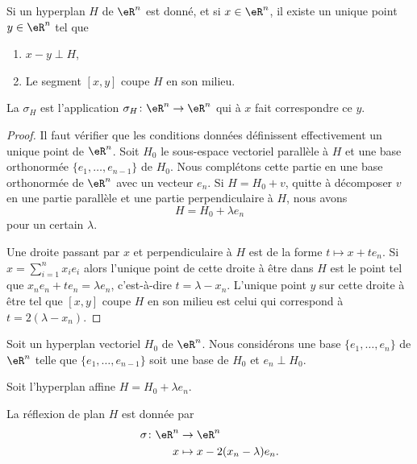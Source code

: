 \begin{lemmaDef}		\label{LEMooPXIOooSlMIIY}
	Si un hyperplan \( H\) de \( \eR^n\) est donné, et si \( x\in \eR^n\), il existe un unique point \( y\in \eR^n\) tel que
	\begin{enumerate}
		\item
		      \( x-y\perp H\),
		\item
		      Le segment \( [x,y]\) coupe \( H\) en son milieu.
	\end{enumerate}
	La  \( \sigma_H\) est l'application \( \sigma_H\colon \eR^n\to \eR^n \) qui à \( x\) fait correspondre ce \( y\).
\end{lemmaDef}

\begin{proof}
	Il faut vérifier que les conditions données définissent effectivement un unique point de \( \eR^n\). Soit \( H_0\) le sous-espace vectoriel parallèle à \( H\) et une base orthonormée \( \{ e_1,\ldots, e_{n-1} \}\) de \( H_0\). Nous complétons cette partie en une base orthonormée de \( \eR^n\) avec un vecteur \( e_n\). Si \( H=H_0+v\), quitte à décomposer \( v\) en une partie parallèle et une partie perpendiculaire à \( H\), nous avons
	\begin{equation}
		H=H_0+\lambda e_n
	\end{equation}
	pour un certain \( \lambda\).

	Une droite passant par \( x\) et perpendiculaire à \( H\) est de la forme \( t\mapsto x+te_n\). Si \( x=\sum_{i=1}^{n}x_ie_i\) alors l'unique point de cette droite à être dans \( H\) est le point tel que \(   x_ne_n+te_n=\lambda e_n   \), c'est-à-dire \( t=\lambda-x_n\). L'unique point \( y\) sur cette droite à être tel que \( [x,y ]\) coupe \( H\) en son milieu est celui qui correspond à \( t=2(\lambda-x_n)\).
\end{proof}

\begin{lemma}
	Soit un hyperplan vectoriel \( H_0\) de \( \eR^n\). Nous considérons une base \( \{ e_1,\ldots,e_n \}\) de \( \eR^n\) telle que \( \{ e_1,\ldots,e_{n-1} \}\) soit une base de \( H_0\) et \( e_n\perp  H_0\).

	Soit l'hyperplan affine \( H=H_0+\lambda e_n\).

	La réflexion de plan \( H \) est donnée par
	\begin{equation} \label{EQooRTWLooLPsUpY}
		\begin{aligned}
			\sigma\colon \eR^n & \to \eR^n                    \\
			x                  & \mapsto x-2(x_n-\lambda)e_n.
		\end{aligned}
	\end{equation}
\end{lemma}


